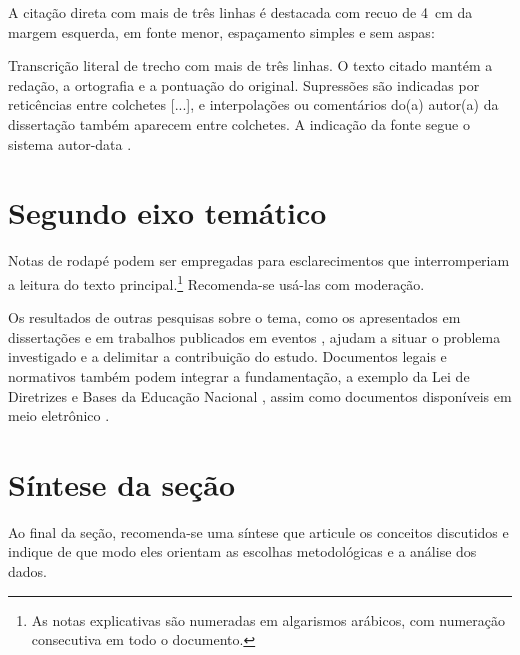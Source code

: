 A citação direta com mais de três linhas é destacada com recuo de 4~cm da margem esquerda, em fonte menor, espaçamento simples e sem aspas:

\begin{citacaolonga}
Transcrição literal de trecho com mais de três linhas. O texto citado mantém a redação, a ortografia e a pontuação do original. Supressões são indicadas por reticências entre colchetes [...], e interpolações ou comentários do(a) autor(a) da dissertação também aparecem entre colchetes. A indicação da fonte segue o sistema autor-data \cite[p.~52]{modelocapitulo}.
\end{citacaolonga}

\section{Segundo eixo temático}
\label{sec:eixo2}

Notas de rodapé podem ser empregadas para esclarecimentos que interromperiam a leitura do texto principal.\footnote{As notas explicativas são numeradas em algarismos arábicos, com numeração consecutiva em todo o documento.} Recomenda-se usá-las com moderação.

Os resultados de outras pesquisas sobre o tema, como os apresentados em dissertações \cite{modelodissertacao} e em trabalhos publicados em eventos \cite{modeloevento}, ajudam a situar o problema investigado e a delimitar a contribuição do estudo. Documentos legais e normativos também podem integrar a fundamentação, a exemplo da Lei de Diretrizes e Bases da Educação Nacional \cite{brasil1996}, assim como documentos disponíveis em meio eletrônico \cite{modeloonline}.

\section{Síntese da seção}
\label{sec:sintese_fundamentacao}

Ao final da seção, recomenda-se uma síntese que articule os conceitos discutidos e indique de que modo eles orientam as escolhas metodológicas e a análise dos dados.
